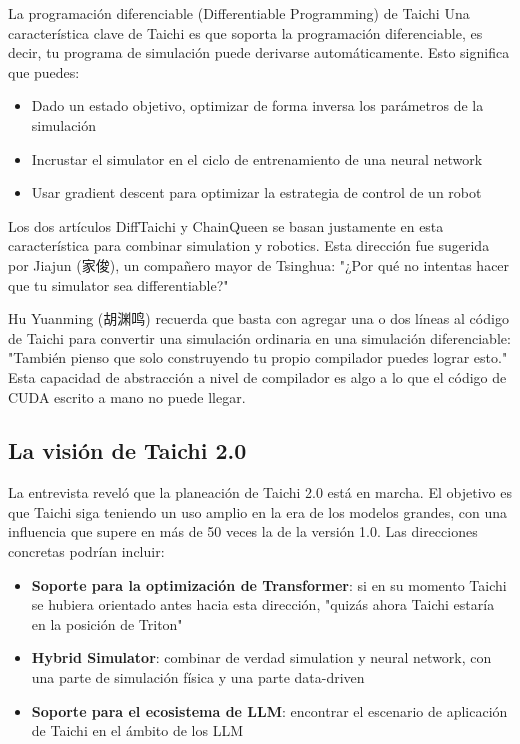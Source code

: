 \documentclass[a4paper]{article}
\begin{document}
\begin{knowledgebox}{La programación diferenciable (Differentiable Programming) de Taichi}
Una característica clave de Taichi es que soporta la programación diferenciable, es decir, tu programa de simulación puede derivarse automáticamente. Esto significa que puedes:
\begin{itemize}
\item Dado un estado objetivo, optimizar de forma inversa los parámetros de la simulación
\item Incrustar el simulator en el ciclo de entrenamiento de una neural network
\item Usar gradient descent para optimizar la estrategia de control de un robot
\end{itemize}
Los dos artículos DiffTaichi y ChainQueen se basan justamente en esta característica para combinar simulation y robotics. Esta dirección fue sugerida por Jiajun (家俊), un compañero mayor de Tsinghua: "¿Por qué no intentas hacer que tu simulator sea differentiable?"
\end{knowledgebox}

Hu Yuanming (胡渊鸣) recuerda que basta con agregar una o dos líneas al código de Taichi para convertir una simulación ordinaria en una simulación diferenciable: "También pienso que solo construyendo tu propio compilador puedes lograr esto." Esta capacidad de abstracción a nivel de compilador es algo a lo que el código de CUDA escrito a mano no puede llegar.

\subsection{La visión de Taichi 2.0}

La entrevista reveló que la planeación de Taichi 2.0 está en marcha. El objetivo es que Taichi siga teniendo un uso amplio en la era de los modelos grandes, con una influencia que supere en más de 50 veces la de la versión 1.0. Las direcciones concretas podrían incluir:

\begin{itemize}
\item \textbf{Soporte para la optimización de Transformer}: si en su momento Taichi se hubiera orientado antes hacia esta dirección, "quizás ahora Taichi estaría en la posición de Triton"
\item \textbf{Hybrid Simulator}: combinar de verdad simulation y neural network, con una parte de simulación física y una parte data-driven
\item \textbf{Soporte para el ecosistema de LLM}: encontrar el escenario de aplicación de Taichi en el ámbito de los LLM
\end{itemize}
\end{document}
